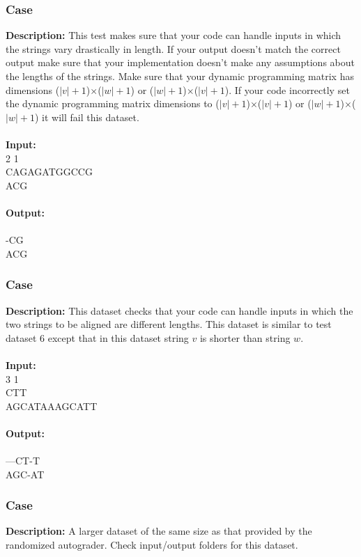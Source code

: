 \documentclass{article}
\newcommand{\code}[1]{{\fontfamily{pcr}\selectfont #1}}
\begin{document}
\subsubsection*{Case }
\hline \vspace{5}
\textbf{Description:} This test makes sure that your code can handle inputs in which the strings vary drastically in length. If your output doesn’t match the correct output make sure that your implementation doesn’t make any assumptions about the lengths of the strings. Make sure that your dynamic programming matrix has dimensions ($|v|+1$)$\times$($|w|+1$) or ($|w|+1$)$\times$($|v|+1$). If your code incorrectly set the dynamic programming matrix dimensions to ($|v|+1$)$\times$($|v|+1$) or ($|w|+1$)$\times$($|w|+1$) it will fail this dataset.\\ \\
\noindent \textbf{Input:}\\
\code{3 2 1\\CAGAGATGGCCG\\ACG}\\ \\
\noindent \textbf{Output:}\\
\code{5\\-CG\\ACG}
\pagebreak

\subsubsection*{Case }
\hline \vspace{5}
\textbf{Description:} This dataset checks that your code can handle inputs in which the two strings to be aligned are different lengths. This dataset is similar to test dataset $6$ except that in this dataset string $v$ is shorter than string $w$.\\ \\
\noindent \textbf{Input:}\\
\code{2 3 1\\CTT\\AGCATAAAGCATT}\\ \\
\noindent \textbf{Output:}\\
\code{0\\---CT-T\\AGC-AT}

\subsubsection*{Case }
\hline \vspace{5}
\textbf{Description:} A larger dataset of the same size as that provided by the randomized autograder. Check input/output folders for this dataset.\\ \\
\pagebreak
\end{document}
